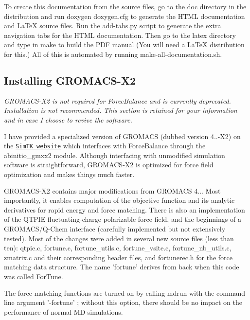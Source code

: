 \-To create this documentation from the source files, go to the {\ttfamily doc} directory in the distribution and run {\ttfamily  doxygen doxygen.\-cfg } to generate the \-H\-T\-M\-L documentation and \-La\-Te\-X source files. \-Run the {\ttfamily add-\/tabs.\-py} script to generate the extra navigation tabs for the \-H\-T\-M\-L documentation. \-Then go to the {\ttfamily latex} directory and type in {\ttfamily make} to build the \-P\-D\-F manual (\-You will need a \-La\-Te\-X distribution for this.) \-All of this is automated by running {\ttfamily make-\/all-\/documentation.\-sh}.\hypertarget{installation_install_gmxx2}{}\subsection{\-Installing G\-R\-O\-M\-A\-C\-S-\/\-X2}\label{installation_install_gmxx2}
{\itshape  \-G\-R\-O\-M\-A\-C\-S-\/\-X2 is not required for \-Force\-Balance and is currently deprecated. \-Installation is not recommended. \-This section is retained for your information and in case \-I choose to revive the software. \/}

\-I have provided a specialized version of \-G\-R\-O\-M\-A\-C\-S (dubbed version 4..-\/\-X2) on the \href{https://simtk.org/home/forcebalance/}{\tt \-Sim\-T\-K website} which interfaces with \-Force\-Balance through the abinitio\-\_\-gmxx2 module. \-Although interfacing with unmodified simulation software is straightforward, \-G\-R\-O\-M\-A\-C\-S-\/\-X2 is optimized for force field optimization and makes things much faster.

\-G\-R\-O\-M\-A\-C\-S-\/\-X2 contains major modifications from \-G\-R\-O\-M\-A\-C\-S 4... \-Most importantly, it enables computation of the objective function and its analytic derivatives for rapid energy and force matching. \-There is also an implementation of the \-Q\-T\-P\-I\-E fluctuating-\/charge polarizable force field, and the beginnings of a \-G\-R\-O\-M\-A\-C\-S/\-Q-\/\-Chem interface (carefully implemented but not extensively tested). \-Most of the changes were added in several new source files (less than ten)\-: {\ttfamily qtpie.\-c}, {\ttfamily fortune.\-c}, {\ttfamily fortune\-\_\-utils.\-c}, {\ttfamily fortune\-\_\-vsite.\-c}, {\ttfamily fortune\-\_\-nb\-\_\-utils.\-c}, {\ttfamily zmatrix.\-c} and their corresponding header files, and {\ttfamily fortunerec.\-h} for the force matching data structure. \-The name 'fortune' derives from back when this code was called \-For\-Tune.

\-The force matching functions are turned on by calling {\ttfamily mdrun} with the command line argument {\ttfamily '-\/fortune'} ; without this option, there should be no impact on the performance of normal \-M\-D simulations.


